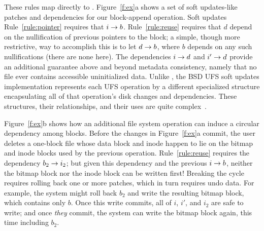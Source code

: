 These rules map directly to \Featherstitch.
%
Figure~\ref{f:ex}a shows a set of soft updates-like patches and dependencies for
 our block-append operation.
%
%
%
%
Soft updates Rule~\ref{rule:pointer} requires that $i \rightarrow b$.
%
Rule~\ref{rule:reuse} requires that $d$ depend on the nullification of previous pointers to the
 block;
%
a simple, though more restrictive, way to accomplish this is to let $d
 \rightarrow b$, where $b$ depends on any such nullifications
 (there are none here).
%
The dependencies $i \rightarrow d$ and $i' \rightarrow d$ provide an
 additional guarantee above and beyond metadata consistency, namely
 that no file ever contains accessible uninitialized data.
%
%
Unlike \Featherstitch, the BSD UFS soft updates implementation represents each UFS
 operation by a different specialized structure encapsulating
 all of that operation's disk changes and dependencies.
These structures, their
relationships, and their uses %
are quite complex~\cite{mckusick99soft}.

\begin{comment}
\begin{figure}[htb]
  \centering
  \texttt{[image: fig/examplesb\_3]}
  \caption{\label{fig:softupdate} Soft updates \patches\
  for appending one block to an empty file in an FFS-like file system.}
\end{figure}
\end{comment}

Figure~\ref{f:ex}b shows how an additional file system operation can induce
 a circular dependency among blocks.
%
Before the changes in Figure~\ref{f:ex}a commit, the user deletes a
 one-block file whose data block and inode happen to lie on the bitmap
 and inode blocks used by the previous operation.
%
Rule~\ref{rule:reuse} requires the dependency $b_2 \rightarrow i_2$; but
 given this dependency and the previous $i \rightarrow b$, neither the bitmap
 block nor the inode block can be written first!
%
Breaking the cycle requires rolling back one or more patches, which in turn
 requires undo data.
%
For example, the system might roll back $b_2$ and write the resulting
 bitmap block, which contains only
 $b$.  Once this write commits, all of $i$, $i'$, and
 $i_2$ are safe to write; and once \emph{they} commit, the system can write
 the bitmap block again, this time including $b_2$.


